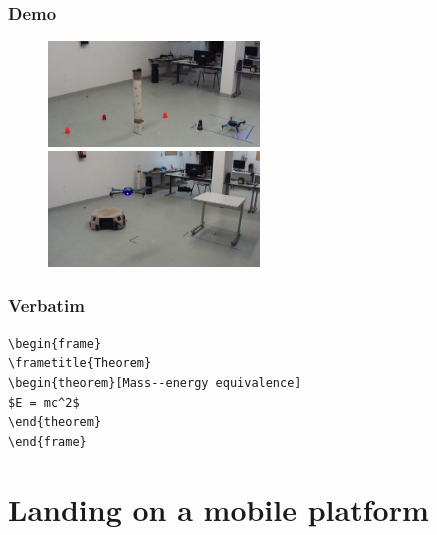 \documentclass[xcolor=dvipsnames]{beamer}
\begin{document}
\begin{frame}
\frametitle{Demo}
\begin{figure}
\includegraphics[width = 0.5\textwidth]{f/circle.png}
\includegraphics[width = 0.5\textwidth]{f/multiland.png}

\end{figure}


\end{frame}


\begin{frame}[fragile] %
\frametitle{Verbatim}
\begin{example}
\begin{verbatim}
\begin{frame}
\frametitle{Theorem}
\begin{theorem}[Mass--energy equivalence]
$E = mc^2$
\end{theorem}
\end{frame}\end{verbatim}
\end{example}
\end{frame}


\section{Landing on a mobile platform}
\end{document}
